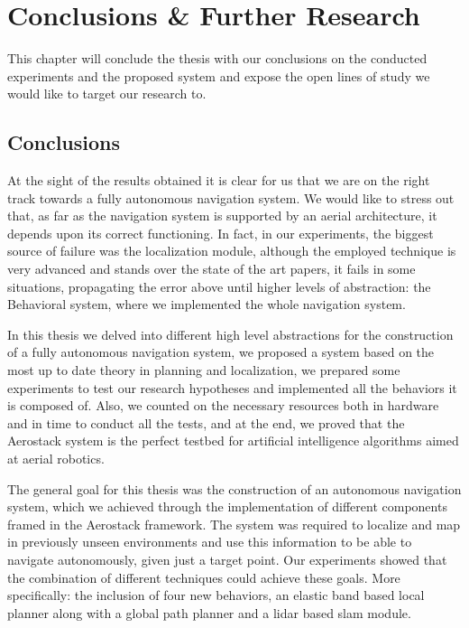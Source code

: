 \chapter{Conclusions \& Further Research} \label{ch_6:chapter}

This chapter will conclude the thesis with our conclusions on the conducted experiments and the proposed system and expose the open lines of study we would like to target our research to. 

\section{Conclusions} \label{ch_6:sect:conclusions}

  At the sight of the results obtained it is clear for us that we are on the right track towards a fully autonomous navigation system. We would like to stress out that, as far as the navigation system is supported by an aerial architecture, it depends upon its correct functioning. In fact, in our experiments, the biggest source of failure was the localization module, although the employed technique is very advanced and stands over the state of the art papers, it fails in some situations, propagating the error above until higher levels of abstraction: the Behavioral system, where we implemented the whole navigation system.

  In this thesis we delved into different high level abstractions for the construction of a fully autonomous navigation system, we proposed a system based on the most up to date theory in planning and localization, we prepared some experiments to test our research hypotheses and implemented all the behaviors it is composed of. Also, we counted on the necessary resources both in hardware and in time to conduct all the tests, and at the end, we proved that the Aerostack system is the perfect testbed for artificial intelligence algorithms aimed at aerial robotics.

  The general goal for this thesis was the construction of an autonomous navigation system, which we achieved through the implementation of different components framed in the Aerostack framework. The system was required to localize and map in previously unseen environments and use this information to be able to navigate autonomously, given just a target point. Our experiments showed that the combination of different techniques could achieve these goals. More specifically: the inclusion of four new behaviors, an elastic band based local planner along with a global path planner and a lidar based slam module. 


